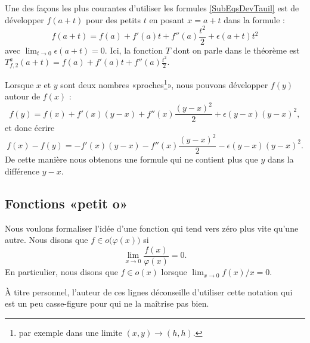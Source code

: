 \begin{example}		\label{ExempleUtlDev}
	Une des façons les plus courantes d'utiliser les formules \eqref{SubEqsDevTauil} est de développer $f(a+t)$ pour des petits $t$ en posant $x=a+t$ dans la formule :
	\begin{equation}	\label{EqDevfautouraeps}
		f(a+t)=f(a)+f'(a)t+f''(a)\frac{ t^2 }{ 2 }+\epsilon(a+t)t^2
	\end{equation}
	avec $\lim_{t\to 0} \epsilon(a+t)=0$. Ici, la fonction $T$ dont on parle dans le théorème est $T_{f,2}^a(a+t)=f(a)+f'(a)t+f''(a)\frac{ t^2 }{2}$.

	Lorsque $x$ et $y$ sont deux nombres «proches\footnote{par exemple dans une limite $(x,y)\to(h,h)$.}», nous pouvons développer $f(y)$ autour de $f(x)$ :
	\begin{equation}		\label{Eqfydevfx}
		f(y)=f(x)+f'(x)(y-x)+f''(x)\frac{ (y-x)^2 }{ 2 }+\epsilon(y-x)(y-x)^2,
	\end{equation}
	et donc écrire
	\begin{equation}
		f(x)-f(y)=-f'(x)(y-x)-f''(x)\frac{ (y-x)^2 }{ 2 }-\epsilon(y-x)(y-x)^2.
	\end{equation}
	De cette manière nous obtenons une formule qui ne contient plus que $y$ dans la différence $y-x$.
\end{example}

\subsection{Fonctions «petit o» }

Nous voulons formaliser l'idée d'une fonction qui tend vers zéro \og plus vite\fg{} qu'une autre. Nous disons que $f\in o\big(\varphi(x)\big)$ si
\begin{equation}
    \lim_{x\to 0} \frac{ f(x) }{ \varphi(x) }=0.
\end{equation}
En particulier, nous disons que $f\in o(x)$ lorsque $\lim_{x\to 0} f(x)/x=0$.

\begin{remark}
    À titre personnel, l'auteur de ces lignes déconseille d'utiliser cette notation qui est un peu casse-figure pour qui ne la maîtrise pas bien.
\end{remark}

